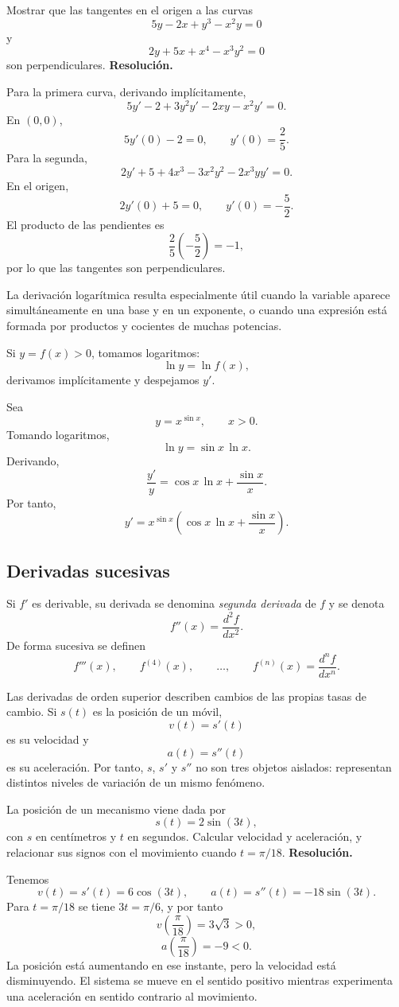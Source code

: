 \begin{solvedexercise}
Mostrar que las tangentes en el origen a las curvas
\[
5y-2x+y^3-x^2y=0
\]
y
\[
2y+5x+x^4-x^3y^2=0
\]
son perpendiculares.
\tcblower
\textbf{Resolución.}\par\smallskip
Para la primera curva, derivando implícitamente,
\[
5y'-2+3y^2y'-2xy-x^2y'=0.
\]
En $(0,0)$,
\[
5y'(0)-2=0,
\qquad
y'(0)=\frac25.
\]
Para la segunda,
\[
2y'+5+4x^3-3x^2y^2-2x^3yy'=0.
\]
En el origen,
\[
2y'(0)+5=0,
\qquad
y'(0)=-\frac52.
\]
El producto de las pendientes es
\[
\frac25\left(-\frac52\right)=-1,
\]
por lo que las tangentes son perpendiculares.
\end{solvedexercise}

La derivación logarítmica resulta especialmente útil cuando la variable aparece simultáneamente en una base y en un exponente, o cuando una expresión está formada por productos y cocientes de muchas potencias.

Si $y=f(x)>0$, tomamos logaritmos:
\[
\ln y=\ln f(x),
\]
derivamos implícitamente y despejamos $y'$.

\begin{example}
Sea
\[
y=x^{\sin x},
\qquad x>0.
\]
Tomando logaritmos,
\[
\ln y=\sin x\,\ln x.
\]
Derivando,
\[
\frac{y'}{y}
=
\cos x\,\ln x+\frac{\sin x}{x}.
\]
Por tanto,
\[
\boxed{
y'=x^{\sin x}\left(\cos x\,\ln x+\frac{\sin x}{x}\right)
}.
\]
\end{example}

\subsection{Derivadas sucesivas}

Si $f'$ es derivable, su derivada se denomina \emph{segunda derivada} de $f$ y se denota
\[
f''(x)=\frac{d^2f}{dx^2}.
\]
De forma sucesiva se definen
\[
f'''(x),
\qquad
f^{(4)}(x),
\qquad
\ldots,
\qquad
f^{(n)}(x)=\frac{d^nf}{dx^n}.
\]

Las derivadas de orden superior describen cambios de las propias tasas de cambio. Si $s(t)$ es la posición de un móvil,
\[
v(t)=s'(t)
\]
es su velocidad y
\[
a(t)=s''(t)
\]
es su aceleración. Por tanto, $s$, $s'$ y $s''$ no son tres objetos aislados: representan distintos niveles de variación de un mismo fenómeno.

\begin{solvedexercise}
La posición de un mecanismo viene dada por
\[
s(t)=2\sin(3t),
\]
con $s$ en centímetros y $t$ en segundos. Calcular velocidad y aceleración, y relacionar sus signos con el movimiento cuando $t=\pi/18$.
\tcblower
\textbf{Resolución.}\par\smallskip
Tenemos
\[
v(t)=s'(t)=6\cos(3t),
\qquad
a(t)=s''(t)=-18\sin(3t).
\]
Para $t=\pi/18$ se tiene $3t=\pi/6$, y por tanto
\[
v\!\left(\frac{\pi}{18}\right)=3\sqrt3>0,
\]
\[
a\!\left(\frac{\pi}{18}\right)=-9<0.
\]
La posición está aumentando en ese instante, pero la velocidad está disminuyendo. El sistema se mueve en el sentido positivo mientras experimenta una aceleración en sentido contrario al movimiento.
\end{solvedexercise}

